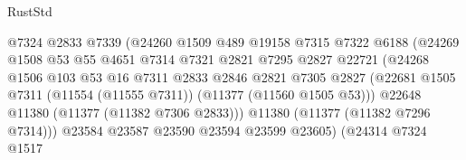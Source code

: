 \begin{lexlean}{RustStd}
\begin{coremodule}
                                        @7324
                                        @2833
                                        @7339
                                        (@24260
                                          @1509
                                          @489
                                          @19158
                                          @7315
                                          @7322
                                          @6188
                                          (@24269
                                            @1508
                                            @53
                                            @55
                                            @4651
                                            @7314
                                            @7321
                                            @2821
                                            @7295
                                            @2827
                                            @22721
                                            (@24268
                                              @1506
                                              @103
                                              @53
                                              @16
                                              @7311
                                              @2833
                                              @2846
                                              @2821
                                              @7305
                                              @2827
                                              (@22681
                                                @1505
                                                @7311
                                                (@11554 (@11555 @7311))
                                                (@11377 (@11560 @1505 @53)))
                                              @22648
                                              @11380
                                              (@11377 (@11382 @7306 @2833)))
                                            @11380
                                            (@11377 (@11382 @7296 @7314)))
                                          @23584
                                          @23587
                                          @23590
                                          @23594
                                          @23599
                                          @23605)
                                        (@24314
                                          @7324
                                          @1517

\end{coremodule}
\end{lexlean}
